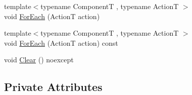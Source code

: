 \begin{DoxyCompactItemize}
\item 
{\footnotesize template$<$typename ComponentT , typename ActionT $>$ }\\void \hyperlink{classmage_1_1rendering_1_1_world_a8c44f285282905dfe861564e5860b1e5}{For\+Each} (ActionT action)
\item 
{\footnotesize template$<$typename ComponentT , typename ActionT $>$ }\\void \hyperlink{classmage_1_1rendering_1_1_world_af8a81616447d7e9716d38c5497aaf650}{For\+Each} (ActionT action) const
\item 
void \hyperlink{classmage_1_1rendering_1_1_world_ac04420d32e7cb0a28c33d7d451ca05cc}{Clear} () noexcept
\end{DoxyCompactItemize}
\subsection*{Private Attributes}

